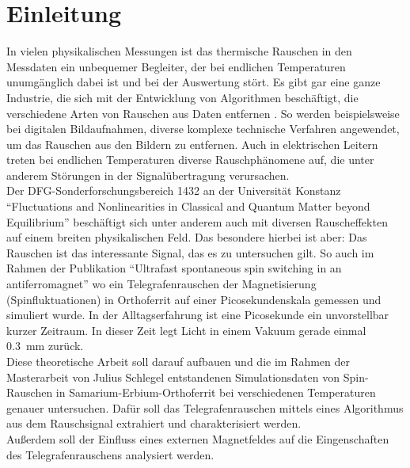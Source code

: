\documentclass[main.tex]{subfiles}
\begin{document}
\section{Einleitung}


In vielen physikalischen Messungen ist das thermische Rauschen in den Messdaten ein unbequemer Begleiter, der bei endlichen Temperaturen unumgänglich dabei ist und bei der Auswertung stört. 
Es gibt gar eine ganze Industrie, die sich mit der Entwicklung von Algorithmen beschäftigt, die verschiedene Arten von Rauschen aus Daten entfernen \cite{digital-noise-reduction}. So werden beispielsweise bei digitalen Bildaufnahmen, diverse komplexe technische Verfahren angewendet, um das Rauschen aus den Bildern zu entfernen. Auch in elektrischen Leitern treten bei endlichen Temperaturen diverse Rauschphänomene auf, die unter anderem Störungen in der Signalübertragung verursachen.\\ 

Der DFG-Sonderforschungsbereich 1432 an der Universität Konstanz \enquote{Fluctuations and Nonlinearities in Classical and Quantum Matter beyond Equilibrium} \cite{sfb-1432} beschäftigt sich unter anderem auch mit diversen Rauscheffekten auf einem breiten physikalischen Feld.
Das besondere hierbei ist aber: Das Rauschen ist das interessante Signal, das es zu untersuchen gilt. So auch im Rahmen der Publikation \enquote{Ultrafast spontaneous spin switching in an antiferromagnet} \cite{weiss-ultrafast} wo ein Telegrafenrauschen der Magnetisierung (Spinfluktuationen) in Orthoferrit auf einer Picosekundenskala gemessen und simuliert wurde. In der Alltagserfahrung ist eine Picosekunde ein unvorstellbar kurzer Zeitraum. In dieser Zeit legt Licht in einem Vakuum gerade einmal \SI{0.3}{\milli\meter} zurück.\\

Diese theoretische Arbeit soll darauf aufbauen und die im Rahmen der Masterarbeit von Julius Schlegel \cite{schlegel-master} entstandenen Simulationsdaten von Spin-Rauschen in Samarium-Erbium-Orthoferrit bei verschiedenen Temperaturen genauer untersuchen. Dafür soll das Telegrafenrauschen mittels eines Algorithmus aus dem Rauschsignal extrahiert und charakterisiert werden.\\
Außerdem soll der Einfluss eines externen Magnetfeldes auf die Eingenschaften des Telegrafenrauschens analysiert werden.
\end{document}
